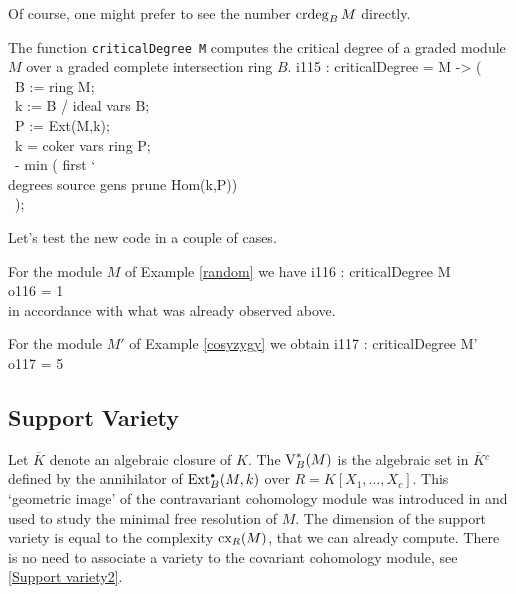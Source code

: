Of course, one might prefer to see the number $\operatorname{crdeg}_BM$ directly.

\begin{sCode}
The function {\tt criticalDegree M} computes the critical degree of a
graded module $M$ over a graded complete intersection ring $B$.
\beginOutput
i115 : criticalDegree = M -> (\\
\          B := ring M;\\
\          k := B / ideal vars B;\\
\          P := Ext(M,k);\\
\          k  = coker vars ring P;\\
\          - min ( first {\char`\\} degrees source gens prune Hom(k,P))\\
\          );\\
\endOutput
\end{sCode}

Let's test the new code in a couple of cases.

\begin{sExample}
For the module $M$ of Example \ref{random} we have
\beginOutput
i116 : criticalDegree M\\
\emptyLine
o116 = 1\\
\endOutput
in accordance with what was already observed above.

For the module $M'$ of Example \ref{cosyzygy} we obtain
\beginOutput
i117 : criticalDegree M'\\
\emptyLine
o117 = 5\\
\endOutput
\end{sExample}

\subsection{Support Variety}
\label{Support variety}

Let $\overline K$ denote an algebraic closure of $K$.  The
{\it{}\/} $\operatorname{V}^*_B(M)$ is the algebraic set in
${\overline K}{}^c$ defined by the annihilator of $\operatorname{Ext}^{\scriptscriptstyle\bullet}_B(M,k)$
over $R=K[X_1,\dots,X_c]$.  This `geometric image' of the
contravariant cohomology module was introduced in \cite{CI:MR90g:13027}
and used to study the minimal free resolution of $M$.  The dimension of
the support variety is equal to the complexity $\operatorname{cx}_R(M)$, that we can
already compute.  There is no need to associate a variety to the
covariant cohomology module, see \ref{Support variety2}.

